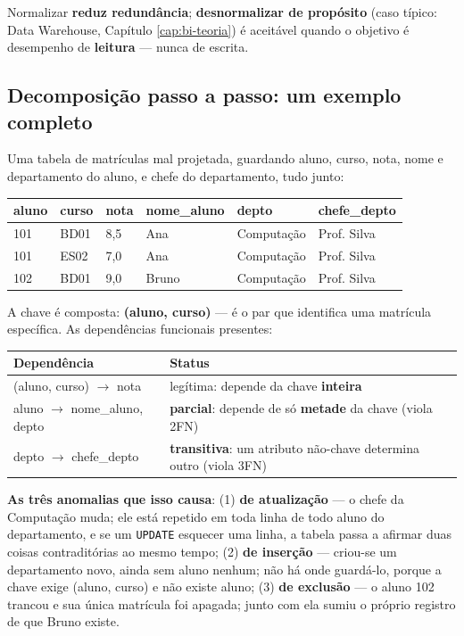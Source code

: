 Normalizar \textbf{reduz redundância}; \textbf{desnormalizar de
propósito} (caso típico: Data Warehouse, Capítulo \ref{cap:bi-teoria}) é
aceitável quando o objetivo é desempenho de \textbf{leitura} --- nunca de
escrita.

\subsection{Decomposição passo a passo: um exemplo completo}

\begin{exemplo}
Uma tabela de matrículas mal projetada, guardando aluno, curso, nota,
nome e departamento do aluno, e chefe do departamento, tudo junto:

\begin{center}
\small
\begin{tabular}{@{}llllll@{}}
\toprule
\textbf{aluno} & \textbf{curso} & \textbf{nota} & \textbf{nome\_aluno} &
\textbf{depto} & \textbf{chefe\_depto} \\
\midrule
101 & BD01 & 8,5 & Ana   & Computação & Prof. Silva \\
101 & ES02 & 7,0 & Ana   & Computação & Prof. Silva \\
102 & BD01 & 9,0 & Bruno & Computação & Prof. Silva \\
\bottomrule
\end{tabular}
\end{center}

A chave é composta: \textbf{(aluno, curso)} --- é o par que identifica uma
matrícula específica. As dependências funcionais presentes:

\begin{center}
\begin{tabular}{@{}p{5cm}p{7.4cm}@{}}
\toprule
\textbf{Dependência} & \textbf{Status} \\
\midrule
(aluno, curso) $\to$ nota & legítima: depende da chave \textbf{inteira} \\
aluno $\to$ nome\_aluno, depto & \textbf{parcial}: depende de só
\textbf{metade} da chave (viola 2FN) \\
depto $\to$ chefe\_depto & \textbf{transitiva}: um atributo não-chave
determina outro (viola 3FN) \\
\bottomrule
\end{tabular}
\end{center}

\textbf{As três anomalias que isso causa}: (1) \textbf{de atualização}
--- o chefe da Computação muda; ele está repetido em toda linha de todo
aluno do departamento, e se um \texttt{UPDATE} esquecer uma linha, a
tabela passa a afirmar duas coisas contraditórias ao mesmo tempo; (2)
\textbf{de inserção} --- criou-se um departamento novo, ainda sem aluno
nenhum; não há onde guardá-lo, porque a chave exige (aluno, curso) e não
existe aluno; (3) \textbf{de exclusão} --- o aluno 102 trancou e sua
única matrícula foi apagada; junto com ela sumiu o próprio registro de que
Bruno existe.


\end{exemplo}
